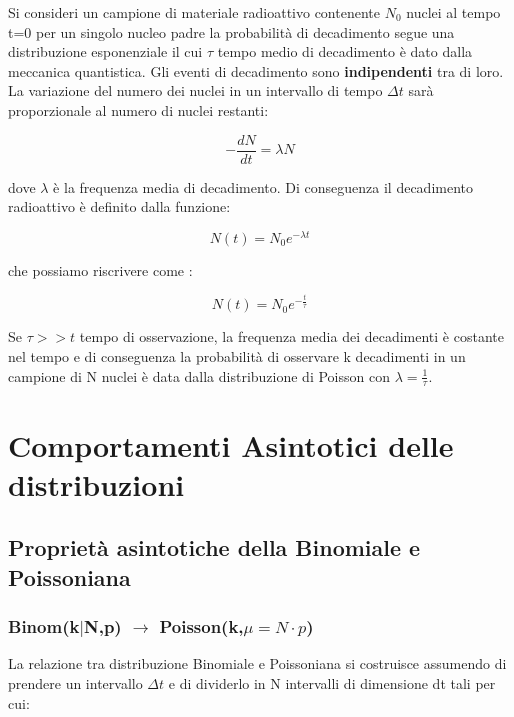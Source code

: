 \documentclass[11pt,a4paper]{book}
\begin{document}
Si consideri un campione di materiale radioattivo contenente $N_{0}$ nuclei al tempo t=0 per un singolo nucleo padre la probabilit\`{a} di decadimento segue una distribuzione esponenziale il cui $\tau$ tempo medio di decadimento \`{e} dato dalla meccanica quantistica. Gli eventi di decadimento sono \textbf{indipendenti} tra di loro.
\newline
La variazione del numero dei nuclei in un intervallo di tempo $\Delta t$ sar\`{a} proporzionale al numero di nuclei restanti:

\begin{equation}
	-\dfrac{dN}{dt} = \lambda N
\end{equation}

dove $\lambda$ \`{e} la frequenza media di decadimento. Di conseguenza il decadimento radioattivo \`{e} definito dalla funzione:

\begin{equation}
	N(t) = N_{0}e^{-\lambda t}
\end{equation}

che possiamo riscrivere come :

\begin{equation}
	N(t) = N_{0} e^{-\frac{t}{\tau}}
\end{equation}

Se $\tau >> t$ tempo di osservazione, la frequenza media dei decadimenti \`{e} costante nel tempo e di conseguenza la probabilit\`{a} di osservare k decadimenti in un campione di N nuclei \`{e} data dalla distribuzione di Poisson con $\lambda = \frac{1}{\tau}$.

\section{Comportamenti Asintotici delle distribuzioni}

\subsection{Propriet\`{a} asintotiche della Binomiale e Poissoniana}

\subsubsection{Binom(k$\vert$N,p) $\rightarrow$ Poisson(k,$\mu = N \cdot p$)}
La relazione tra distribuzione Binomiale e Poissoniana si costruisce assumendo di prendere un intervallo $\Delta t$ e di dividerlo in N intervalli di dimensione dt tali per cui:
\end{document}

